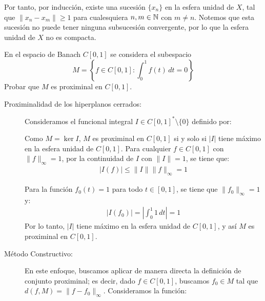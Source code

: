 \begin{ejercicio}
Por tanto, por inducción, existe una sucesión $\{x_n\}$ en la esfera unidad de $X$, tal que $\|x_n - x_m\| \geq 1$ para cualesquiera $n, m \in \mathbb{N}$ con $m \neq n$. Notemos que esta sucesión no puede tener ninguna subsucesión convergente, por lo que la esfera unidad de $X$ no es compacta.
\end{ejercicio}

\begin{ejercicio}
En el espacio de Banach $C\left[0, 1\right]$ se considera el subespacio
\[
M = \left\{f \in C\left[0, 1\right] : \int_{0}^1 f(t)\,dt = 0\right\}
\]
Probar que $M$ es proximinal en $C\left[0, 1\right]$.

\begin{description}
    \item[Proximinalidad de los hiperplanos cerrados:]
    
    Consideramos el funcional integral $I\in C[0, 1]^*\setminus \{0\}$ definido por:
    
    Como $M=\ker I$, $M$ es proximinal en $C[0, 1]$ si y solo si $|I|$ tiene máximo en la esfera unidad de $C[0, 1]$. Para cualquier $f\in C[0, 1]$ con $\|f\|_\infty = 1$, por la continuidad de $I$ con $\|I\|=1$, se tiene que:
    \begin{align*}
        |I(f)| \leq \|I\| \|f\|_\infty = 1
    \end{align*}

    Para la función $f_0(t) = 1$ para todo $t \in [0, 1]$, se tiene que $\|f_0\|_\infty = 1$ y:
    \begin{align*}
        |I(f_0)| = \left|\int_{0}^1 1\,dt\right| = 1
    \end{align*}
    Por lo tanto, $|I|$ tiene máximo en la esfera unidad de $C[0, 1]$, y así $M$ es proximinal en $C[0, 1]$.


    \item[Método Constructivo:] En este enfoque, buscamos aplicar de manera directa la definición de conjunto proximinal; es decir, dado $f\in C[0,1]$, buscamos $f_0\in M$ tal que $d(f,M)=\|f-f_0\|_\infty$. Consideramos la función:


\end{description}
\end{ejercicio}
